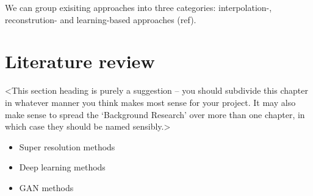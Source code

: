 We can group exisiting approaches into three categories: interpolation-, reconstrution- and learning-based approaches (ref).

\section{Literature review}
<This section heading is purely a suggestion -- you should subdivide this chapter in whatever manner you think makes most sense for your project. It may also make sense to spread the `Background Research' over more than one chapter, in which case they should be named sensibly.>

\begin{itemize}
    \item Super resolution methods
    \item Deep learning methods
    \item GAN methods
\end{itemize}
